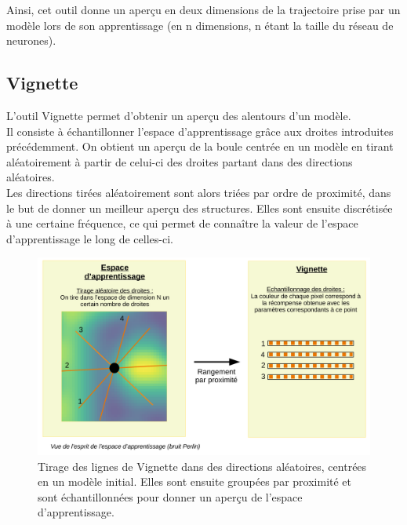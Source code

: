 \documentclass[12pt]{article}
\begin{document}
Ainsi, cet outil donne un aperçu en deux dimensions de la trajectoire prise par un modèle lors de son apprentissage (en n dimensions, n étant la taille du réseau de neurones). \\

\newpage
\subsection{Vignette}

L’outil Vignette permet d’obtenir un aperçu des alentours d’un modèle. \\

Il consiste à échantillonner l’espace d’apprentissage grâce aux droites introduites précédemment. On obtient un aperçu de la boule centrée en un modèle en tirant aléatoirement à partir de celui-ci des droites partant dans des directions aléatoires.\\

Les directions tirées aléatoirement sont alors triées par ordre de proximité, dans le but de donner un meilleur aperçu des structures. Elles sont ensuite discrétisée à une certaine fréquence, ce qui permet de connaître la valeur de l'espace d'apprentissage le long de celles-ci. \\

\begin{figure}[htp]
    \centering
    \includegraphics[width=18cm]{Images/vignetteDessin}
    \caption{Tirage des lignes de Vignette dans des directions aléatoires, centrées en un modèle initial. Elles sont ensuite groupées par proximité et sont échantillonnées pour donner un aperçu de l'espace d'apprentissage.}
    \label{fig:vignetteDessin}
\end{figure}
\end{document}
